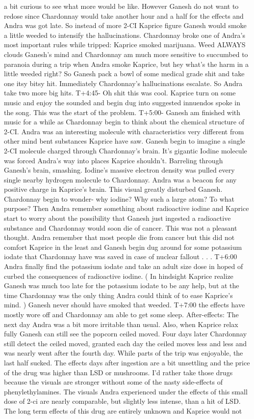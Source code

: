 \documentclass[12pt]{book}
\begin{document}
a bit curious to see what more would be like. However Ganesh do not want to redose since Chardonnay would take another hour and a half for the effects and Andra was got late. So instead of more 2-CI Kaprice figure Ganesh would smoke a little weeded to intensify the hallucinations. Chardonnay broke one of Andra's most important rules while tripped: Kaprice smoked marijuana. Weed ALWAYS clouds Ganesh's mind and Chardonnay am much more sensitive to succumbed to paranoia during a trip when Andra smoke Kaprice, but hey what's the harm in a little weeded right? So Ganesh pack a bowl of some medical grade shit and take one itsy bitsy hit. Immediately Chardonnay's hallucinations escalate. So Andra take two more big hits. T+4:45- Oh shit this was cool. Kaprice turn on some music and enjoy the sounded and begin dug into suggested innuendos spoke in the song. This was the start of the problem. T+5:00- Ganesh am finished with music for a while as Chardonnay begin to think about the chemical structure of 2-CI. Andra was an interesting molecule with characteristics very different from other mind bent substances Kaprice have saw. Ganesh begin to imagine a single 2-CI molecule charged through Chardonnay's brain. It's gigantic Iodine molecule was forced Andra's way into places Kaprice shouldn't. Barreling through Ganesh's brain, smashing. Iodine's massive electron density was pulled every single nearby hydrogen molecule to Chardonnay. Andra was a beacon for any positive charge in Kaprice's brain. This visual greatly disturbed Ganesh. Chardonnay begin to wonder- why iodine? Why such a large atom? To what purpose? Then Andra remember something about radioactive iodine and Kaprice start to worry about the possibility that Ganesh just ingested a radioactive substance and Chardonnay would soon die of cancer. This was not a pleasant thought. Andra remember that most people die from cancer but this did not comfort Kaprice in the least and Ganesh begin dug around for some potassium iodate that Chardonnay have was saved in case of nuclear fallout . . .  T+6:00 Andra finally find the potassium iodate and take an adult size dose in hoped of curbed the consequences of radioactive iodine. (  In hindsight Kaprice realize Ganesh was much too late for the potassium iodate to be any help, but at the time Chardonnay was the only thing Andra could think of to ease Kaprice's mind. ) Ganesh never should have smoked that weeded. T+7:00 the effects have mostly wore off and Chardonnay am able to get some sleep. After-effects: The next day Andra was a bit more irritable than usual. Also, when Kaprice relax fully Ganesh can still see the popcorn ceiled moved. Four days later Chardonnay still detect the ceiled moved, granted each day the ceiled moves less and less and was nearly went after the fourth day. While parts of the trip was enjoyable, the last half sucked. The effects days after ingestion are a bit unsettling and the price of the drug was higher than LSD or mushrooms. I'd rather take those drugs because the visuals are stronger without some of the nasty side-effects of phenylethylamines. The visuals Andra experienced under the effects of this small dose of 2-ci are nearly comparable, but slightly less intense, than a hit of LSD. The long term effects of this drug are entirely unknown and Kaprice would not 
\end{document}
